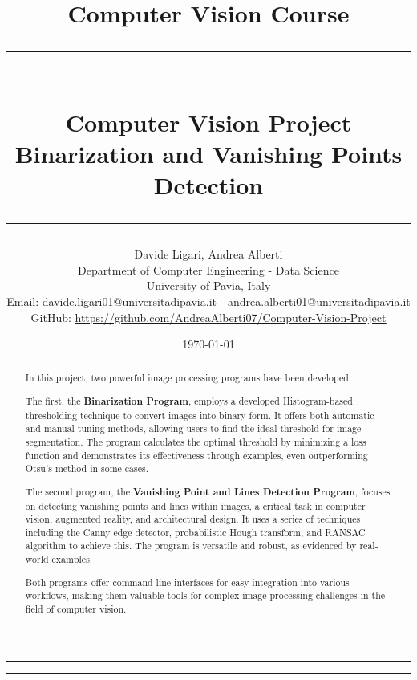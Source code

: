 \documentclass{class}
\title{\Large Computer Vision Course\vspace{0.4cm}\\
    \rule{\textwidth}{0.3pt}\vspace{0.3cm}\\
    \textbf{Computer Vision Project}\vspace{0.2cm}\\
    \large{Binarization and Vanishing Points Detection}
    \rule{\textwidth}{0.3pt}\vspace{0.5cm}}
\author{Davide Ligari, Andrea Alberti\vspace{0.2cm}\\
    \small Department of Computer Engineering - Data Science\\
    \small University of Pavia, Italy \\
    \small Email: davide.ligari01@universitadipavia.it - andrea.alberti01@universitadipavia.it \\
    \small GitHub: \href{https://github.com/AndreaAlberti07/Computer-Vision-Project}{\underline{https://github.com/AndreaAlberti07/Computer-Vision-Project}}\vspace{0.5cm}}
\date{\today}
\begin{document}
\begin{titlepage}
   
        \maketitle
        \thispagestyle{empty}

    \begin{multicols*}{2}
            
        \hrule
        \begin{abstract}
        \noindent
        In this project, two powerful image processing programs have been developed.

        The first, the \textbf{Binarization Program}, employs a developed Histogram-based thresholding technique to 
        convert images into binary form. It offers both automatic and manual tuning methods, allowing users to find 
        the ideal threshold for image segmentation. The program calculates the optimal threshold by minimizing a loss
        function and demonstrates its effectiveness through examples, even outperforming Otsu's method in some cases.

        The second program, the \textbf{Vanishing Point and Lines Detection Program}, focuses on detecting vanishing 
        points and lines within images, a critical task in computer vision, augmented reality, and architectural design. 
        It uses a series of techniques including the Canny edge detector, probabilistic Hough transform, and RANSAC 
        algorithm to achieve this. The program is versatile and robust, as evidenced by real-world examples.

        Both programs offer command-line interfaces for easy integration into various workflows, making them valuable tools for complex image processing challenges in the field of computer vision.
        \\
        \end{abstract}
        \newcolumn
        \hrule
        \tableofcontents
    \end{multicols*}
\end{titlepage}

\clearpage
\pagestyle{FirstPage}

\clearpage

\end{document}
